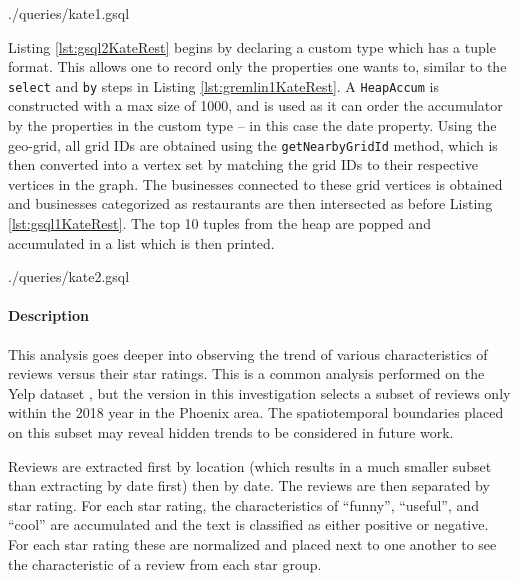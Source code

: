 
{./queries/kate1.gsql}

Listing \ref{lst:gsql2KateRest} begins by declaring a custom type which has a tuple format. This allows one to record only the properties one wants to, similar to the \texttt{select} and \texttt{by} steps in Listing \ref{lst:gremlin1KateRest}. A \texttt{HeapAccum} is constructed with a max size of 1000, and is used as it can order the accumulator by the properties in the custom type -- in this case the date property. Using the geo-grid, all grid IDs are obtained using the \texttt{getNearbyGridId} method, which is then converted into a vertex set by matching the grid IDs to their respective vertices in the graph. The businesses connected to these grid vertices is obtained and businesses categorized as restaurants are then intersected as before Listing \ref{lst:gsql1KateRest}. The top 10 tuples from the heap are popped and accumulated in a list which is then printed.


{./queries/kate2.gsql}



\paragraph{Description}
This analysis goes deeper into observing the trend of various characteristics of reviews versus their star ratings. This is a common analysis performed on the Yelp dataset \cite{yelp-trends-zhang}, but the version in this investigation selects a subset of reviews only within the 2018 year in the Phoenix area. The spatiotemporal boundaries placed on this subset may reveal hidden trends to be considered in future work.

Reviews are extracted first by location (which results in a much smaller subset than extracting by date first) then by date. The reviews are then separated by star rating. For each star rating, the characteristics of ``funny'', ``useful'', and ``cool'' are accumulated and the text is classified as either positive or negative. For each star rating these are normalized and placed next to one another to see the characteristic of a review from each star group.

